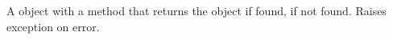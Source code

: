 A  object with a  method that returns the object if
found,  if not found.  Raises exception on error.
